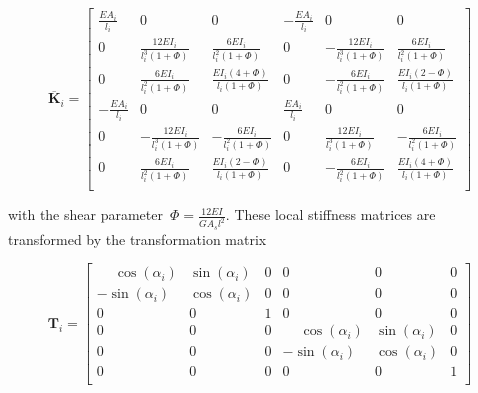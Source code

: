 \begin{equation}
\renewcommand\arraystretch{1.5}
\overline{\boldsymbol{K}}_i = \begin{bmatrix}
 \frac{EA_i}{l_i} &                           0 &                                0 & -\frac{EA_i}{l_i} &                           0 &                                0 \\
            0 &  \frac{12EI_i}{l_i^3(1 + \Phi)} &        \frac{6EI_i}{l_i^2(1 + \Phi)} &             0 & -\frac{12EI_i}{l_i^3(1 + \Phi)} &        \frac{6EI_i}{l_i^2(1 + \Phi)} \\
            0 &   \frac{6EI_i}{l_i^2(1 + \Phi)} & \frac{EI_i(4 + \Phi)}{l_i(1 + \Phi)} &             0 &  -\frac{6EI_i}{l_i^2(1 + \Phi)} & \frac{EI_i(2 - \Phi)}{l_i(1 + \Phi)} \\
-\frac{EA_i}{l_i} &                           0 &                                0 &  \frac{EA_i}{l_i} &                           0 &                                0 \\
            0 & -\frac{12EI_i}{l_i^3(1 + \Phi)} &       -\frac{6EI_i}{l_i^2(1 + \Phi)} &             0 &  \frac{12EI_i}{l_i^3(1 + \Phi)} &       -\frac{6EI_i}{l_i^2(1 + \Phi)} \\
            0 &   \frac{6EI_i}{l_i^2(1 + \Phi)} & \frac{EI_i(2 - \Phi)}{l_i(1 + \Phi)} &             0 &  -\frac{6EI_i}{l_i^2(1 + \Phi)} & \frac{EI_i(4 + \Phi)}{l_i(1 + \Phi)} \\
\end{bmatrix}
\end{equation}

with the shear parameter~$\Phi = \frac{12EI}{GA_s l^2}$.
These local stiffness matrices are transformed by the transformation matrix

\begin{equation}
\renewcommand\arraystretch{1.5}
\boldsymbol{T}_i = \begin{bmatrix}
\phantom{-}\cos(\alpha_i) & \sin(\alpha_i) & 0 & 0 & 0 & 0 \\
          -\sin(\alpha_i) & \cos(\alpha_i) & 0 & 0 & 0 & 0 \\
                      0 &            0 & 1 & 0 & 0 & 0 \\
0 & 0 & 0 & \phantom{-}\cos(\alpha_i) & \sin(\alpha_i) & 0 \\
0 & 0 & 0 &           -\sin(\alpha_i) & \cos(\alpha_i) & 0 \\
0 & 0 & 0 &                       0 &            0 & 1 \\
\end{bmatrix}
\end{equation}

